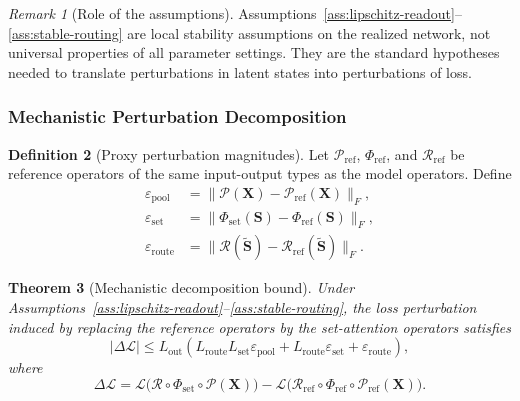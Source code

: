 \documentclass{article}
\theoremstyle{plain}
\newtheorem{theorem}{Theorem}[section]
\theoremstyle{definition}
\newtheorem{definition}[theorem]{Definition}
\theoremstyle{remark}
\newtheorem{remark}[theorem]{Remark}
\begin{document}
\begin{remark}[Role of the assumptions]
\label{rem:regularity-assumptions}
Assumptions~\ref{ass:lipschitz-readout}--\ref{ass:stable-routing} are local stability assumptions on the realized network, not universal properties of all parameter settings. They are the standard hypotheses needed to translate perturbations in latent states into perturbations of loss.
\end{remark}

\subsubsection{Mechanistic Perturbation Decomposition}
\label{sec:tier-b-mechanistic}

\begin{definition}[Proxy perturbation magnitudes]
\label{def:proxy-perturbations}
Let $\mathcal{P}_{\mathrm{ref}}$, $\Phi_{\mathrm{ref}}$, and $\mathcal{R}_{\mathrm{ref}}$ be reference operators of the same input-output types as the model operators. Define
\begin{align}
\label{eq:eps-pool}
\varepsilon_{\mathrm{pool}}
&=
\|\mathcal{P}(\mathbf{X})-\mathcal{P}_{\mathrm{ref}}(\mathbf{X})\|_F,
\\
\label{eq:eps-set}
\varepsilon_{\mathrm{set}}
&=
\|\Phi_{\mathrm{set}}(\mathbf{S})-\Phi_{\mathrm{ref}}(\mathbf{S})\|_F,
\\
\label{eq:eps-route}
\varepsilon_{\mathrm{route}}
&=
\|\mathcal{R}(\tilde{\mathbf{S}})-\mathcal{R}_{\mathrm{ref}}(\tilde{\mathbf{S}})\|_F.
\end{align}
\end{definition}

\begin{theorem}[Mechanistic decomposition bound]
\label{thm:mechanistic-decomposition}
Under Assumptions~\ref{ass:lipschitz-readout}--\ref{ass:stable-routing}, the loss perturbation induced by replacing the reference operators by the set-attention operators satisfies
\begin{equation}
\label{eq:mechanistic-decomposition-bound}
|\Delta \mathcal{L}|
\le
L_{\mathrm{out}}
\left(
L_{\mathrm{route}}L_{\mathrm{set}}\varepsilon_{\mathrm{pool}}
+
L_{\mathrm{route}}\varepsilon_{\mathrm{set}}
+
\varepsilon_{\mathrm{route}}
\right),
\end{equation}
where
\[
\Delta \mathcal{L}
=
\mathcal{L}\bigl(\mathcal{R}\circ \Phi_{\mathrm{set}}\circ \mathcal{P}(\mathbf{X})\bigr)
-
\mathcal{L}\bigl(\mathcal{R}_{\mathrm{ref}}\circ \Phi_{\mathrm{ref}}\circ \mathcal{P}_{\mathrm{ref}}(\mathbf{X})\bigr).
\]
\end{theorem}
\end{document}
